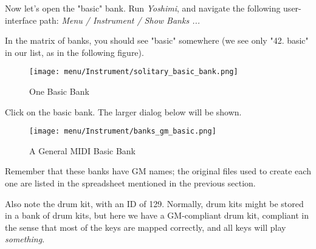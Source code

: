    Now let's open the "basic" bank.
   Run \textsl{Yoshimi}, and navigate the following user-interface path:
   \textsl{Menu / Instrument / Show Banks ...}

   In the matrix of banks, you should see "basic" somewhere (we see only
   "42. basic" in our list, as in the following figure).

\begin{figure}[H]
   \centering 
   \texttt{[image: menu/Instrument/solitary\_basic\_bank.png]}
   \caption{One Basic Bank}
   \label{fig:cookbook_bank_solitary_bank}
\end{figure}
   
   Click on the basic bank.  The larger dialog below will be shown.

\begin{figure}[H]
   \centering 
   \texttt{[image: menu/Instrument/banks\_gm\_basic.png]}
   \caption{A General MIDI Basic Bank}
   \label{fig:cookbook_bank_basic_bank}
\end{figure}

Remember that these banks have GM names; the original files used to create
each one are listed in the spreadsheet mentioned in the previous section.

Also note the drum kit, with an ID of 129.  Normally, drum kits might be
stored in a bank of drum kits, but here we have a GM-compliant drum kit,
compliant in the sense that most of the keys are mapped correctly,
and all keys will play \textsl{something}.

